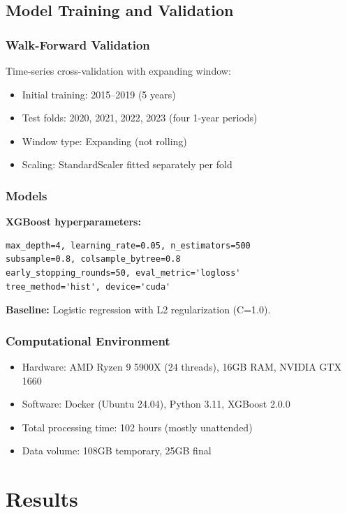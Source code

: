 \documentclass[11pt]{article}
\begin{document}
\subsection{Model Training and Validation}

\subsubsection{Walk-Forward Validation}

Time-series cross-validation with expanding window:
\begin{itemize}
    \item Initial training: 2015--2019 (5 years)
    \item Test folds: 2020, 2021, 2022, 2023 (four 1-year periods)
    \item Window type: Expanding (not rolling)
    \item Scaling: StandardScaler fitted separately per fold
\end{itemize}

\subsubsection{Models}

\textbf{XGBoost hyperparameters:}
\begin{verbatim}
max_depth=4, learning_rate=0.05, n_estimators=500
subsample=0.8, colsample_bytree=0.8
early_stopping_rounds=50, eval_metric='logloss'
tree_method='hist', device='cuda'
\end{verbatim}

\textbf{Baseline:} Logistic regression with L2 regularization (C=1.0).

\subsubsection{Computational Environment}

\begin{itemize}
    \item Hardware: AMD Ryzen 9 5900X (24 threads), 16GB RAM, NVIDIA GTX 1660
    \item Software: Docker (Ubuntu 24.04), Python 3.11, XGBoost 2.0.0
    \item Total processing time: 102 hours (mostly unattended)
    \item Data volume: 108GB temporary, 25GB final
\end{itemize}

\section{Results}
\end{document}

